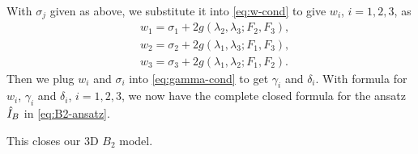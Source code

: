 With $\sigma_j$ given as above, we substitute it into
\eqref{eq:w-cond} to give $w_i$, $i=1,2,3$, as
\begin{equation}\label{eq:w-formula}
  \begin{split}
    & w_1 = \sigma_1 + 2 g(\lambda_2, \lambda_3; F_2, F_3), \\
    & w_2 = \sigma_2 + 2 g(\lambda_1, \lambda_3; F_1, F_3), \\
    & w_3 = \sigma_3 + 2 g(\lambda_1, \lambda_2; F_1, F_2).
  \end{split}
\end{equation}
Then we plug $w_i$ and $\sigma_i$ into \eqref{eq:gamma-cond} to get
$\gamma_i$ and $\delta_i$. With formula for $w_i$, $\gamma_i$ and
$\delta_i$, $i = 1,2,3$, we now have the complete closed formula for
the ansatz $\hat I_B$ in \eqref{eq:B2-ansatz}.


This closes our 3D $B_2$ model.  

